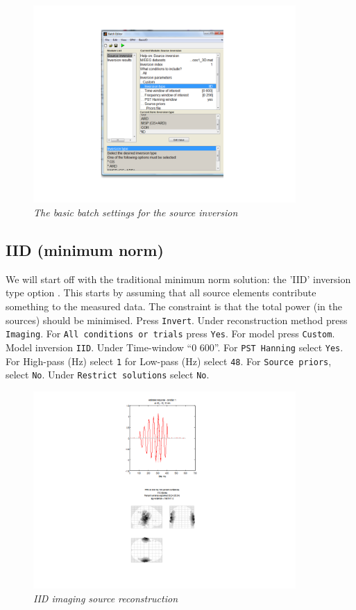 \begin{figure}
\begin{center}
\includegraphics[width=100mm]{meg_sloc/slide3}
\caption{\em The basic batch settings for the source inversion} \label{meg_sloc:fig:3}
\end{center}
\end{figure}

\subsection{IID (minimum norm)}
We will start off with the traditional minimum norm solution: the 'IID' inversion type option . This starts by assuming that all source elements contribute something to the measured data. The constraint is that the total power (in the sources) should be minimised.
Press \texttt{Invert}. Under reconstruction method press \texttt{Imaging}. For \texttt{All conditions or trials} press \texttt{Yes}. For model press \texttt{Custom}. Model inversion \texttt{IID}. Under Time-window ``0 600''. For \texttt{PST Hanning} select \texttt{Yes}. For High-pass (Hz) select \texttt{1} for Low-pass (Hz) select \texttt{48}. For \texttt{Source priors}, select \texttt{No}. Under \texttt{Restrict solutions} select \texttt{No}. 

\begin{figure}
\begin{center}
\includegraphics[width=100mm]{meg_sloc/slide4}
\caption{\em IID imaging source reconstruction \label{meg_sloc:fig:4}}
\end{center}
\end{figure}

